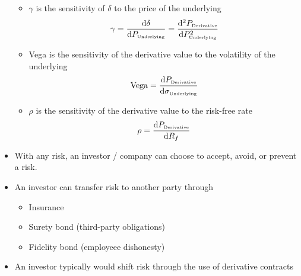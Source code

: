 \documentclass[../notes_compiled.tex]{subfiles}
\begin{document}
\begin{itemize}
\begin{itemize}
\begin{equation}
\end{equation}
\item $\gamma$ is the sensitivity of $\delta$ to the price of the underlying
\begin{equation}
\gamma = \frac{\mathrm{d}\delta}{\mathrm{d}P_{\text{\tiny{Underlying}}}} = \frac{\mathrm{d}^{2}P_{\text{\tiny{Derivative}}}}{\mathrm{d}P_{\text{\tiny{Underlying}}}^{2}}
\end{equation}
\item Vega is the sensitivity of the derivative value to the volatility of the underlying
\begin{equation}
\text{Vega} = \frac{\mathrm{d}P_{\text{\tiny{Derivative}}}}{\mathrm{d}\sigma_{\text{\tiny{Underlying}}}}
\end{equation}
\item $\rho$ is the sensitivity of the derivative value to the risk-free rate
\begin{equation}
\rho = \frac{\mathrm{d}P_{\text{\tiny{Derivative}}}}{\mathrm{d}R_{f}}
\end{equation}
\end{itemize}
\item With any risk, an investor / company can choose to accept, avoid, or prevent a risk.
\item An investor can transfer risk to another party through
\begin{itemize}
\item Insurance
\item Surety bond (third-party obligations)
\item Fidelity bond (employeee dishonesty)
\end{itemize}
\item An investor typically would shift risk through the use of derivative contracts
\end{itemize}
\end{document}
